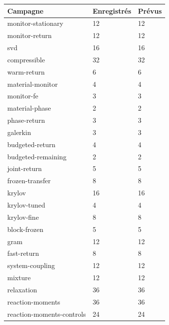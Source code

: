 \documentclass[10pt,a4paper]{article}
\begin{document}
\begin{center}\small\begin{tabular}{lll}\toprule
Campagne & Enregistrés & Prévus\\\midrule
monitor-stationary & 12 & 12\\
monitor-return & 12 & 12\\
svd & 16 & 16\\
compressible & 32 & 32\\
warm-return & 6 & 6\\
material-monitor & 4 & 4\\
monitor-fe & 3 & 3\\
material-phase & 2 & 2\\
phase-return & 3 & 3\\
galerkin & 3 & 3\\
budgeted-return & 4 & 4\\
budgeted-remaining & 2 & 2\\
joint-return & 5 & 5\\
frozen-transfer & 8 & 8\\
krylov & 16 & 16\\
krylov-tuned & 4 & 4\\
krylov-fine & 8 & 8\\
block-frozen & 5 & 5\\
gram & 12 & 12\\
fast-return & 8 & 8\\
system-coupling & 12 & 12\\
mixture & 12 & 12\\
relaxation & 36 & 36\\
reaction-moments & 36 & 36\\
reaction-moments-controls & 24 & 24\\
\bottomrule\end{tabular}\end{center}
\end{document}
